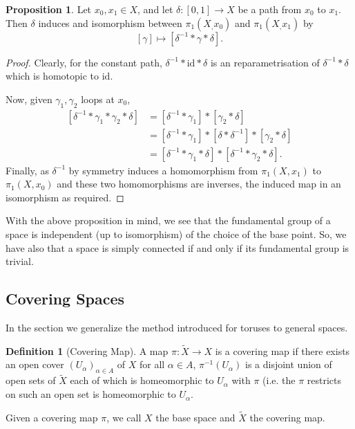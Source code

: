\documentclass[]{article}
\theoremstyle{definition}
\theoremstyle{definition}
\newtheorem{definition}{Definition}[section]
\newtheorem{proposition}{Proposition}[section]
\begin{document}
\begin{proposition}
  Let \(x_0, x_1 \in X\), and let \(\delta : [0, 1] \to X\) be a path from \(x_0\) 
  to \(x_1\). Then \(\delta\) induces and isomorphism between \(\pi_1(X_, x_0)\) 
  and \(\pi_1(X_, x_1)\) by 
  \[[\gamma] \mapsto [\delta^{-1} * \gamma * \delta].\]
\end{proposition}
\begin{proof}
  Clearly, for the constant path, \(\delta^{-1} * \text{id} * \delta\) is an 
  reparametrisation of \(\delta^{-1} * \delta\) which is homotopic to \(\text{id}\).
  
  Now, given \(\gamma_1, \gamma_2\) loops at \(x_0\), 
  \[\begin{split}
    [\delta^{-1} * \gamma_1 * \gamma_2 * \delta] & = [\delta^{-1} * \gamma_1] * [\gamma_2 * \delta] \\
    & = [\delta^{-1} * \gamma_1] * [\delta * \delta^{-1}] * [\gamma_2 * \delta]  \\
    & = [\delta^{-1} * \gamma_1 * \delta] * [\delta^{-1} * \gamma_2 * \delta].
  \end{split}\]
  Finally, as \(\delta^{-1}\) by symmetry induces a homomorphism from \(\pi_1(X, x_1)\) 
  to \(\pi_1(X, x_0)\) and these two homomorphisms are inverses, the induced map
  in an isomorphism as required.
\end{proof}

With the above proposition in mind, we see that the fundamental group of a space is 
independent (up to isomorphism) of the choice of the base point. So, we have also 
that a space is simply connected if and only if its fundamental group is trivial.

\subsection{Covering Spaces}

In the section we generalize the method introduced for toruses to general spaces.

\begin{definition}[Covering Map]
  A map \(\pi : \tilde X \to X\) is a covering map if there exists an open cover 
  \((U_\alpha)_{\alpha \in A}\) of \(X\) for all \(\alpha \in A\), \(\pi^{-1}(U_\alpha)\) 
  is a disjoint union of open sets of \(\tilde X\) each of which is homeomorphic to 
  \(U_\alpha\) with \(\pi\) (i.e. the \(\pi\) restricts on such an open set is 
  homeomorphic to \(U_\alpha\).

  Given a covering map \(\pi\), we call \(X\) the base space and \(\tilde X\) the 
  covering map.
\end{definition}
\end{document}
